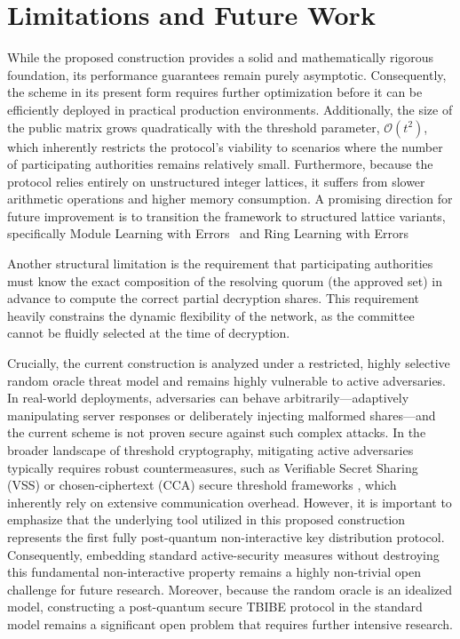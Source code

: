 \section{Limitations and Future Work}

While the proposed construction provides a solid and mathematically rigorous foundation, its performance guarantees remain purely asymptotic. Consequently, the scheme in its present form requires further optimization before it can be efficiently deployed in practical production environments. Additionally, the size of the public matrix grows quadratically with the threshold parameter, $\mathcal{O}(t^2)$, which inherently restricts the protocol's viability to scenarios where the number of participating authorities remains relatively small. Furthermore, because the protocol relies entirely on unstructured integer lattices, it suffers from slower arithmetic operations and higher memory consumption. A promising direction for future improvement is to transition the framework to structured lattice variants, specifically Module Learning with Errors~\cite{JACM:LyuPeiReg13} and Ring Learning with Errors~\cite{DCC:LanSte14}

Another structural limitation is the requirement that participating authorities must know the exact composition of the resolving quorum (the approved set) in advance to compute the correct partial decryption shares. This requirement heavily constrains the dynamic flexibility of the network, as the committee cannot be fluidly selected at the time of decryption.

Crucially, the current construction is analyzed under a restricted, highly selective random oracle threat model and remains highly vulnerable to active adversaries. In real-world deployments, adversaries can behave arbitrarily—adaptively manipulating server responses or deliberately injecting malformed shares—and the current scheme is not proven secure against such complex attacks. In the broader landscape of threshold cryptography, mitigating active adversaries typically requires robust countermeasures, such as Verifiable Secret Sharing (VSS) \cite{FOCS:Feldman87} or chosen-ciphertext (CCA) secure threshold frameworks \cite{JC:ShoGen00}, which inherently rely on extensive communication overhead. However, it is important to emphasize that the underlying tool utilized in this proposed construction represents the first fully post-quantum non-interactive key distribution protocol. Consequently, embedding standard active-security measures without destroying this fundamental non-interactive property remains a highly non-trivial open challenge for future research. Moreover, because the random oracle is an idealized model, constructing a post-quantum secure TBIBE protocol in the standard model remains a significant open problem that requires further intensive research.

